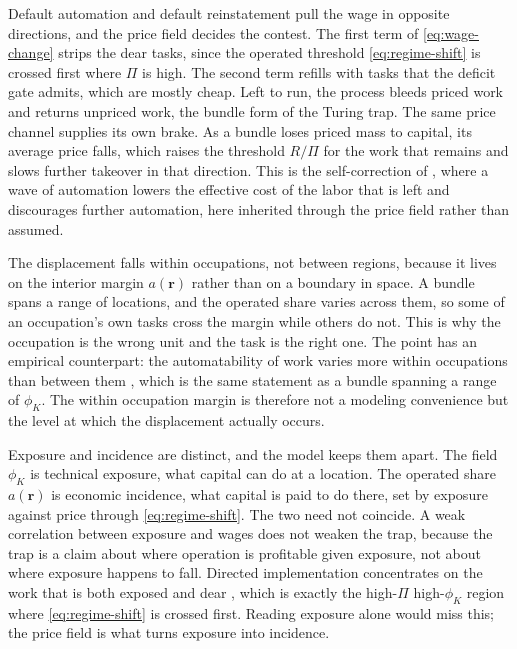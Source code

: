 \documentclass[12pt, a4paper]{article}
\begin{document}
Default automation and default reinstatement pull the wage in opposite
directions, and the price field decides the contest. The first term of
\eqref{eq:wage-change} strips the dear tasks, since the operated
threshold \eqref{eq:regime-shift} is crossed first where $\Pi$ is high.
The second term refills with tasks that the deficit gate admits, which
are mostly cheap. Left to run, the process bleeds priced work and
returns unpriced work, the bundle form of the Turing trap. The same
price channel supplies its own brake. As a bundle loses priced mass to
capital, its average price falls, which raises the threshold $R/\Pi$ for
the work that remains and slows further takeover in that direction. This
is the self-correction of \textcite{acemoglu2018race}, where a wave of
automation lowers the effective cost of the labor that is left and
discourages further automation, here inherited through the price field
rather than assumed.

The displacement falls within occupations, not between regions, because
it lives on the interior margin $a(\mathbf{r})$ rather than on a
boundary in space. A bundle spans a range of locations, and the
operated share varies across them, so some of an occupation's own tasks
cross the margin while others do not. This is why the occupation is the
wrong unit and the task is the right one. The point has an empirical
counterpart: the automatability of work varies more within occupations
than between them \parencite{brynjolfsson2018mlworkforce}, which is the
same statement as a bundle spanning a range of $\phi_K$. The within
occupation margin is therefore not a modeling convenience but the level
at which the displacement actually occurs.

Exposure and incidence are distinct, and the model keeps them apart.
The field $\phi_K$ is technical exposure, what capital can do at a
location. The operated share $a(\mathbf{r})$ is economic incidence, what
capital is paid to do there, set by exposure against price through
\eqref{eq:regime-shift}. The two need not coincide. A weak correlation
between exposure and wages does not weaken the trap, because the trap is
a claim about where operation is profitable given exposure, not about
where exposure happens to fall. Directed implementation concentrates on
the work that is both exposed and dear
\parencite{brynjolfsson2018mlworkforce}, which is exactly the high-$\Pi$
high-$\phi_K$ region where \eqref{eq:regime-shift} is crossed first.
Reading exposure alone would miss this; the price field is what turns
exposure into incidence.
\end{document}
